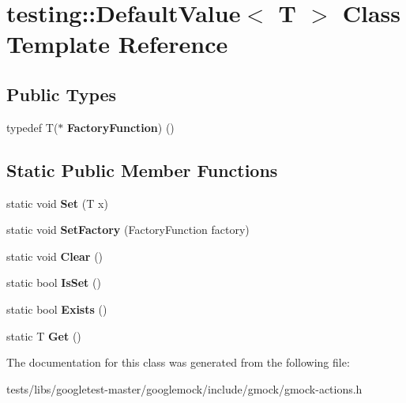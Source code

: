 \hypertarget{classtesting_1_1DefaultValue}{}\section{testing\+:\+:Default\+Value$<$ T $>$ Class Template Reference}
\label{classtesting_1_1DefaultValue}
\subsection*{Public Types}
\begin{DoxyCompactItemize}
\item 
\mbox{\label{classtesting_1_1DefaultValue_a5763a68d75e0a4c97fcaff708e2df803}} 
typedef T($\ast$ {\bfseries Factory\+Function}) ()
\end{DoxyCompactItemize}
\subsection*{Static Public Member Functions}
\begin{DoxyCompactItemize}
\item 
\mbox{\label{classtesting_1_1DefaultValue_a5698814be364b9ac26e72ad37d6ff14e}} 
static void {\bfseries Set} (T x)
\item 
\mbox{\label{classtesting_1_1DefaultValue_af012445ff5b194940c1427529707cb91}} 
static void {\bfseries Set\+Factory} (Factory\+Function factory)
\item 
\mbox{\label{classtesting_1_1DefaultValue_a8163037b60311177cb211f070c512ee3}} 
static void {\bfseries Clear} ()
\item 
\mbox{\label{classtesting_1_1DefaultValue_ad49febe2c944cbbd06451ba7d0366ca1}} 
static bool {\bfseries Is\+Set} ()
\item 
\mbox{\label{classtesting_1_1DefaultValue_aec1ff9b510af7dbb86c837fd2409fd70}} 
static bool {\bfseries Exists} ()
\item 
\mbox{\label{classtesting_1_1DefaultValue_a4dc6dfee4cbc9cdb36f5c9cde5cf2b83}} 
static T {\bfseries Get} ()
\end{DoxyCompactItemize}


The documentation for this class was generated from the following file\+:\begin{DoxyCompactItemize}
\item 
tests/libs/googletest-\/master/googlemock/include/gmock/gmock-\/actions.\+h\end{DoxyCompactItemize}
